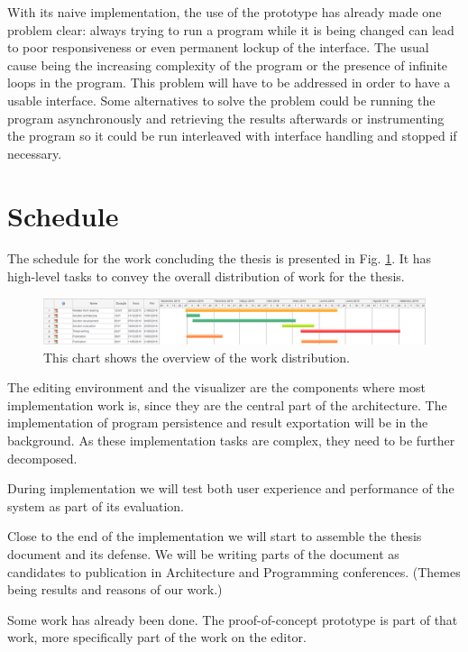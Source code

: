\documentclass{./llncs2e/llncs}
\begin{document}
	With its naive implementation, the use of the prototype has already made one problem clear: always trying to run a program while it is being changed can lead to poor responsiveness or even permanent lockup of the interface.
	The usual cause being the increasing complexity of the program or the presence of infinite loops in the program. 
	This problem will have to be addressed in order to have a usable interface. 
	Some alternatives to solve the problem could be running the program asynchronously and retrieving the results afterwards or instrumenting the program so it could be run interleaved with interface handling and stopped if necessary.

\section{Schedule}
	The schedule for the work concluding the thesis is presented in Fig. \ref{fig:schedule}.
	It has high-level tasks to convey the overall distribution of work for the thesis.
	
	\begin{figure}
		\centering
		\includegraphics[width=1.0\textwidth]{img/schedule}
		\caption{This chart shows the overview of the work distribution.}
		\label{fig:schedule}
	\end{figure}
	
	The editing environment and the visualizer are the components where most implementation work is, since they are the central part of the architecture.
	The implementation of program persistence and result exportation will be in the background.
	As these implementation tasks are complex, they need to be further decomposed.
	
	During implementation we will test both user experience and performance of the system as part of its evaluation.
	
	Close to the end of the implementation we will start to assemble the thesis document and its defense.
	We will be writing parts of the document as candidates to publication in Architecture and Programming conferences.
	(Themes being results and reasons of our work.)
	
	Some work has already been done.
	The proof-of-concept prototype is part of that work, more specifically part of the work on the editor.
		
\end{document}

